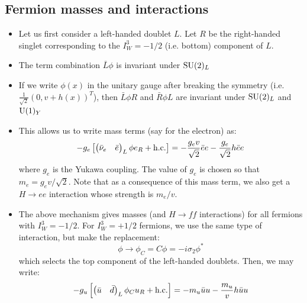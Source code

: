 \subsection{Fermion masses and interactions}
\begin{itemize}
  \item Let us first consider a left-handed doublet $L$. Let $R$ be the right-handed singlet corresponding to the $I^3_W = -1/2$ (i.e. bottom) component of $L$.
  \item The term combination $\bar L \phi$ is invariant under $\operatorname{SU}(2)_L$
  \item If we write $\phi(x)$ in the unitary gauge after breaking the symmetry (i.e. $\frac{1}{\sqrt2}(0,v+h(x))^T$), then $\bar L \phi R$ and $\bar R \phi L$ are invariant under $\operatorname{SU}(2)_L$ and $\operatorname{U}(1)_Y$
  \item This allows us to write mass terms (say for the electron) as:
  \begin{equation}
    - g_e \left[\begin{pmatrix} {\bar{\nu}}_e & \bar e \end{pmatrix}_L \phi e_R + \text{h.c.}\right] = - \frac{g_e v}{\sqrt2} \bar e e - \frac{g_e}{\sqrt2} h\bar e e 
  \end{equation}
  where $g_e$ is the Yukawa coupling. The value of $g_e$ is chosen so that $m_e = g_e v /\sqrt2$. Note that as a consequence of this mass term, we also get a $H\rightarrow ee$ interaction whose strength is $m_e/v$.
  \item The above mechanism gives masses (and $H\rightarrow ff$ interactions) for all fermions with $I_W^3 = -1/2$. For $I_W^3 = +1/2$ fermions, we use the same type of interaction, but make the replacement:
  \begin{equation}
    \phi \rightarrow \phi_C = C \phi = -i\sigma_2 \phi^*
  \end{equation}
  which selects the top component of the left-handed doublets. Then, we may write:
  \begin{equation}
    - g_u \left[\begin{pmatrix} \bar{u} & \bar{d} \end{pmatrix}_L \phi_C u_R+ \text{h.c.}\right] = - m_u \bar u u - \frac{m_u}{v} h \bar u u
  \end{equation}
\end{itemize}

